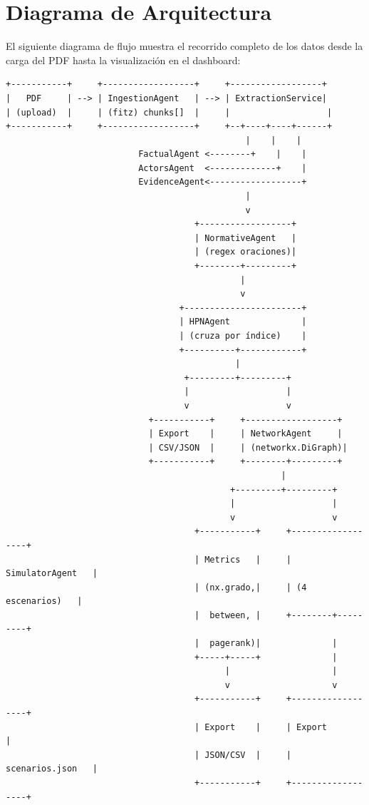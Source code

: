 \documentclass[12pt, letterpaper]{article}
\begin{document}
\newpage
\section{Diagrama de Arquitectura}

\noindent El siguiente diagrama de flujo muestra el recorrido
completo de los datos desde la carga del PDF hasta la visualización
en el dashboard:

\begin{verbatim}
+-----------+     +------------------+     +------------------+
|   PDF     | --> | IngestionAgent   | --> | ExtractionService|
| (upload)  |     | (fitz) chunks[]  |     |                   |
+-----------+     +------------------+     +--+----+----+------+
                                               |    |    |
                          FactualAgent <--------+    |    |
                          ActorsAgent  <-------------+    |
                          EvidenceAgent<------------------+
                                               |
                                               v
                                     +------------------+
                                     | NormativeAgent   |
                                     | (regex oraciones)|
                                     +--------+---------+
                                              |
                                              v
                                  +-----------------------+
                                  | HPNAgent              |
                                  | (cruza por índice)    |
                                  +----------+------------+
                                             |
                                   +---------+---------+
                                   |                   |
                                   v                   v
                            +-----------+     +------------------+
                            | Export    |     | NetworkAgent     |
                            | CSV/JSON  |     | (networkx.DiGraph)|
                            +-----------+     +--------+---------+
                                                      |
                                            +---------+---------+
                                            |                   |
                                            v                   v
                                     +-----------+     +------------------+
                                     | Metrics   |     | SimulatorAgent   |
                                     | (nx.grado,|     | (4 escenarios)   |
                                     |  between, |     +--------+---------+
                                     |  pagerank)|              |
                                     +-----+-----+              |
                                           |                    |
                                           v                    v
                                     +-----------+     +------------------+
                                     | Export    |     | Export           |
                                     | JSON/CSV  |     | scenarios.json   |
                                     +-----------+     +------------------+
                                                               

\end{verbatim}
\end{document}
